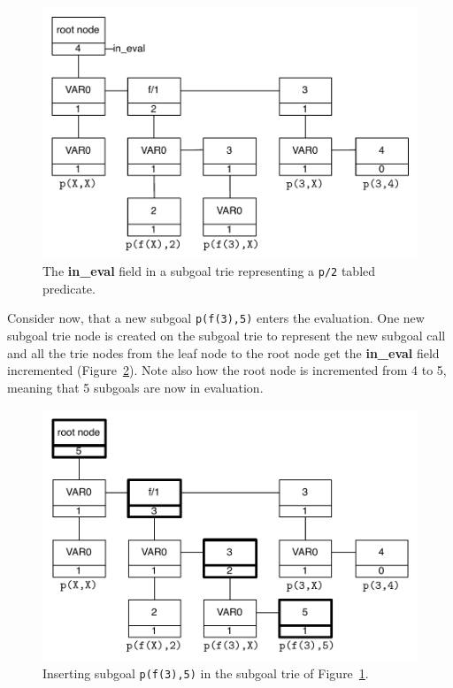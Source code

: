 \begin{figure}[ht]
\centering
\includegraphics[scale=0.6]{in_eval_trie}
\caption{The \textbf{in\_eval} field in a subgoal trie representing a \texttt{p/2}
  tabled predicate.}
\label{fig:in_eval_trie}
\end{figure}

Consider now, that a new subgoal \texttt{p(f(3),5)} enters the
evaluation. One new subgoal trie node is created on the subgoal trie
to represent the new subgoal call and all the trie nodes from the leaf
node to the root node get the \textbf{in\_eval} field incremented
(Figure~\ref{fig:in_eval_add}). Note also how the root node is
incremented from 4 to 5, meaning that 5 subgoals are now in
evaluation.

\begin{figure}[ht]
\centering
\includegraphics[scale=0.6]{in_eval_add}
\caption{Inserting subgoal \texttt{p(f(3),5)} in the subgoal trie of
  Figure~\ref{fig:in_eval_trie}.}
\label{fig:in_eval_add}
\end{figure}

